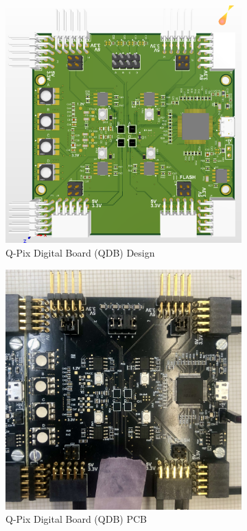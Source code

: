 \begin{figure}
\centering
\begin{subfigure}{.5\textwidth}
  \centering
  \includegraphics[width=\textwidth]{images/qdb_layout_altium.png}
  \caption{Q-Pix Digital Board (QDB) Design}
\end{subfigure}%
\begin{subfigure}{.5\textwidth}
  \centering
  \includegraphics[width=\textwidth]{images/qdb_closeup.jpg}
  \caption{Q-Pix Digital Board (QDB) PCB}
\end{subfigure}
\caption{}
\label{fig:qdb_diagram}
\end{figure}

